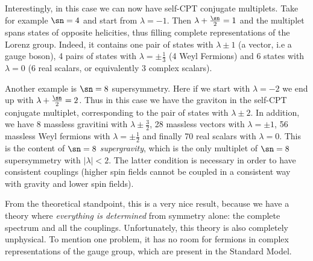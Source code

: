 \par Interestingly, in this case we can now have self-CPT conjugate multiplets.
Take for example $\sn = 4$ and start from $\lambda = -1$. Then $\lambda
+ \frac{\sn}{2} = 1$ and the multiplet spans states of opposite helicities,
thus filling complete representations of the Lorenz group. Indeed, it contains
one pair of states with $\lambda\pm1$ (a vector, i.e a gauge boson), 4 pairs of
states with $\lambda=\pm\frac{1}{3}$ (4 Weyl Fermions) and 6 states with
$\lambda = 0$ (6 real scalars, or equivalently 3 complex scalars).
\par Another example is $\sn = 8$ supersymmetry. Here if we start with $\lambda
= -2$ we end up with $\lambda + \frac{\sn}{2} = 2$. Thus in this case we have
the graviton in the self-CPT conjugate multiplet, corresponding to the pair of
states with $\lambda\pm2$. In addition, we have 8 massless gravitini with
$\lambda\pm\frac{3}{2}$, 28 massless vectors with $\lambda = \pm 1$, 56
massless Weyl fermions with $\lambda = \pm\frac{1}{2}$ and finally 70 real
scalars with $\lambda = 0$. This is the content of $\sn = 8$
\textit{supergravity}, which is the only multiplet of $\sn = 8$ supersymmetry
with $|\lambda|<2$. The latter condition is necessary in order to have
consistent couplings (higher spin fields cannot be coupled in a consistent way
with gravity and lower spin fields).
\par From the theoretical standpoint, this is a very nice result, because we
have a theory where \textit{everything is determined} from symmetry alone: the
complete spectrum and all the couplings. Unfortunately, this theory is also
completely unphysical. To mention one problem, it has no room for fermions in
complex representations of the gauge group, which are present in the Standard
Model.

